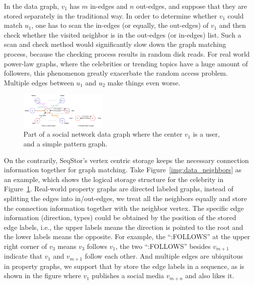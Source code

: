 In the data graph, $v_1$ has $m$ in-edges and $n$ out-edges, and suppose that they are stored separately in the traditional way.
In order to determine whether $v_1$ could match $u_1$,
one has to scan the in-edges (or equally, the out-edges) of $v_1$ and then check whether the visited neighbor is in the out-edges (or in-edges) list.
Such a scan and check method would significantly slow down the graph matching process,
because the checking process results in random disk reads.
For real world power-law graphs, where the celebrities or trending topics have a huge amount of followers, this phenomenon greatly exacerbate the random access problem.
Multiple edges between $u_1$ and $u_2$ make things even worse. 
\begin{figure}[ht]
  \centering
  \includegraphics[width=0.38\textwidth]{img/celebrity_star.pdf}
  \caption{Part of a social network data graph where the center $v_1$ is a user, and a simple pattern graph.}\label{img:celebrity_star}
\end{figure}

On the contrarily, SeqStor's vertex centric storage keeps the necessary connection information together for graph matching.
Take Figure~\ref{img:data_neighbors} as an example, which shows the logical storage structure for the celebrity in Figure~\ref{img:celebrity_star}.
Real-world property graphs are directed labeled graphs, instead of splitting the edges into in/out-edges,
we treat all the neighbors equally and store the connection information together with the neighbor vertex.
The specific edge information (direction, types) could be obtained by the position of the stored edge labels, i.e.,
the upper labels means the direction is pointed to the root and the lower labels means the opposite.
For example, the ``:FOLLOWS'' at the upper right corner of $v_3$ means $v_3$ follows $v_1$,
the two ``:FOLLOWS'' besides $v_{m+1}$ indicate that $v_1$ and $v_{m+1}$ follow each other.
And multiple edges are ubiquitous in property graphs, we support that by store the edge labels in a sequence,
as is shown in the figure where $v_1$ publishes a social media $v_{m+n}$ and also likes it.

